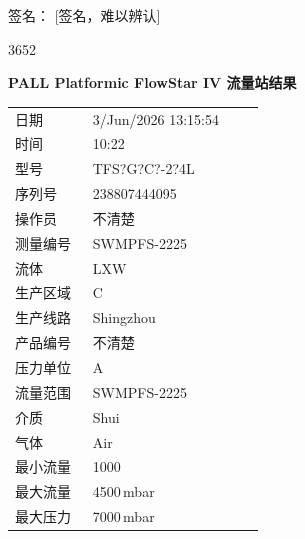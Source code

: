 \documentclass[UTF8,10pt,a4paper,fontset=fandol]{ctexart}
\newcommand{\fieldvalue}[1]{#1}
\newcommand{\handwritten}[1]{#1}
\begin{document}
\vspace{0.5em}

\noindent
签名：%
\fieldvalue{\handwritten{[签名，难以辨认]}}

\handwritten{3652}


\newpage

\begin{center}
\textbf{PALL Platformic FlowStar IV 流量站结果}
\end{center}

\begin{tabular}{@{}p{0.28\linewidth}p{0.62\linewidth}@{}}
日期 &
\fieldvalue{3/Jun/2026 13:15:54} \\[2pt]
时间 &
\fieldvalue{10:22} \\[2pt]
型号 &
\fieldvalue{TFS?G?C?-2?4L} \\[2pt]
序列号 &
\fieldvalue{238807444095} \\[2pt]
操作员 &
\fieldvalue{不清楚} \\[2pt]
测量编号 &
\fieldvalue{SWMPFS-2225} \\[2pt]
流体 &
\fieldvalue{LXW} \\[2pt]
生产区域 &
\fieldvalue{C} \\[2pt]
生产线路 &
\fieldvalue{Shingzhou} \\[2pt]
产品编号 &
\fieldvalue{不清楚} \\[2pt]
压力单位 &
\fieldvalue{A} \\[2pt]
流量范围 &
\fieldvalue{SWMPFS-2225} \\[2pt]
介质 &
\fieldvalue{Shui} \\[2pt]
气体 &
\fieldvalue{Air} \\[2pt]
最小流量 &
\fieldvalue{1000} \\[2pt]
最大流量 &
\fieldvalue{4500\,mbar} \\[2pt]
最大压力 &
\fieldvalue{7000\,mbar}
\end{tabular}
\end{document}
